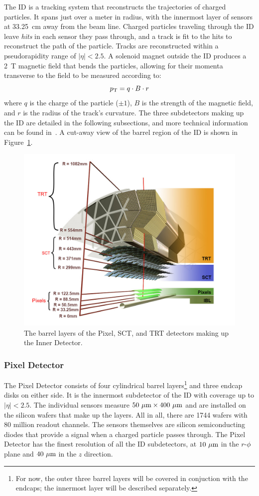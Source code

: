 ﻿The ID is a tracking system that reconstructs the trajectories of charged particles.
It spans just over a meter in radius, with the innermost layer of sensors at 33.25~cm away from the beam line.
Charged particles traveling through the ID leave \emph{hits} in each sensor they pass through, and a track is fit to the hits to reconstruct the path of the particle.
Tracks are reconstructed within a pseudorapidity range of $|\eta| < 2.5$.
A solenoid magnet outside the ID produces a 2~T magnetic field that bends the particles, allowing for their momenta transverse to the field to be measured according to:
\begin{equation}
  \pt = q\cdot B\cdot r
  \label{eq:id_pt}
\end{equation}
where $q$ is the charge of the particle ($\pm 1$), $B$ is the strength of the magnetic field, and $r$ is the radius of the track's curvature.
The three subdetectors making up the ID are detailed in the following subsections, and more technical information can be found in~\cite{1997.id-tdr-1, 1997.id-tdr-2}.
A cut-away view of the barrel region of the ID is shown in Figure~\ref{fig:detector_ID}.

\begin{figure}
  \centering
  \includegraphics[width=.8\textwidth]{figs/detector/ID}
  \caption{The barrel layers of the Pixel, SCT, and TRT detectors making up the Inner Detector.}
  \label{fig:detector_ID}
\end{figure}

\subsubsection{Pixel Detector} \label{sec:pixel}
The Pixel Detector consists of four cylindrical barrel layers\footnote{For now, the outer three barrel layers will be covered in conjuction with the endcaps; the innermost layer will be described separately.} and three endcap disks on either side.
It is the innermost subdetector of the ID with coverage up to $|\eta| < 2.5$.
The individual sensors measure $50~\mu\textrm{m}\times 400~\mu\textrm{m}$ and are installed on the silicon wafers that make up the layers.
All in all, there are 1744 wafers with 80 million readout channels.
The sensors themselves are silicon semiconducting diodes that provide a signal when a charged particle passes through.
The Pixel Detector has the finest resolution of all the ID subdetectors, at $10~\mu\textrm{m}$ in the $r$-$\phi$ plane and $40~\mu\textrm{m}$ in the $z$ direction.

